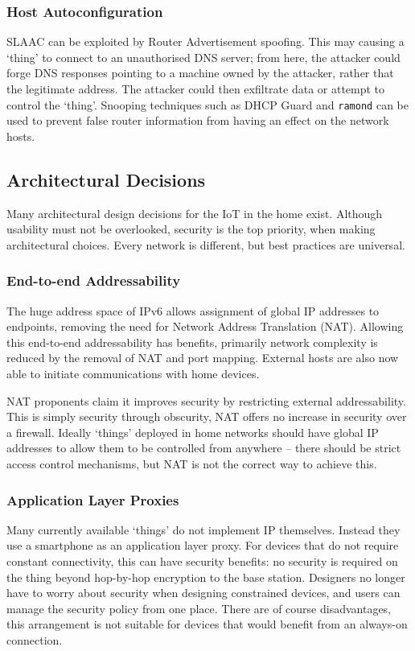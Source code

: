 \documentclass[10pt,journal,compsoc]{IEEEtran}
\begin{document}
\subsubsection{Host Autoconfiguration}
SLAAC can be exploited by Router Advertisement spoofing. This may causing a
`thing' to connect to an unauthorised DNS server; from here, the attacker could
forge DNS responses pointing to a machine owned by the attacker, rather that
the legitimate address. The attacker could then exfiltrate data or attempt to
control the `thing'. Snooping techniques such as DHCP Guard and {\tt ramond}
can be used to prevent false router information from having an effect on the
network hosts.  

\subsection{Architectural Decisions}
Many architectural design decisions for the IoT in the home exist. Although
usability must not be overlooked, security is the top priority, when making
architectural choices. Every network is different, but best practices are
universal. 

\subsubsection{End-to-end Addressability}
The huge address space of IPv6 allows assignment of global IP addresses to
endpoints, removing the need for Network Address Translation (NAT). Allowing
this end-to-end addressability has benefits, primarily network complexity is
reduced by the removal of NAT and port mapping. External hosts are also now
able to initiate communications with home devices.

NAT proponents claim it improves security by restricting external
addressability. This is simply security through obscurity, NAT offers no
increase in security over a firewall. Ideally `things' deployed in home
networks should have global IP addresses to allow them to be controlled from
anywhere -- there should be strict access control mechanisms, but NAT is not
the correct way to achieve this. 

\subsubsection{Application Layer Proxies}
Many currently available `things' do not implement IP themselves. Instead they
use a smartphone as an application layer proxy. For devices that do not require
constant connectivity, this can have security benefits: no security is required
on the thing beyond hop-by-hop encryption to the base station.  Designers no
longer have to worry about security when designing constrained devices, and
users can manage the security policy from one place. There are of course
disadvantages, this arrangement is not suitable for devices that would benefit
from an always-on connection. 
\end{document}
